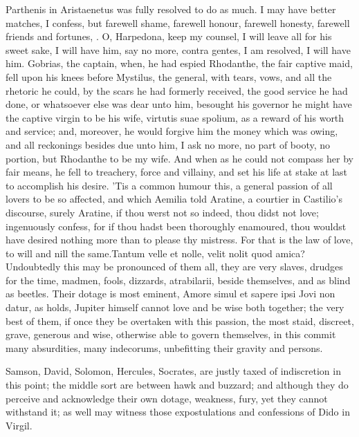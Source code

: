 Parthenis in Aristaenetus was fully resolved to do as much. I may
have better matches, I confess, but farewell shame, farewell honour,
farewell honesty, farewell friends and fortunes, \etc{}. O, Harpedona, keep
my counsel, I will leave all for his sweet sake, I will have him, say
no more, contra gentes, I am resolved, I will have him. Gobrias,
the captain, when, he had espied Rhodanthe, the fair captive maid, fell
upon his knees before Mystilus, the general, with tears, vows, and all
the rhetoric he could, by the scars he had formerly received, the good
service he had done, or whatsoever else was dear unto him, besought his
governor he might have the captive virgin to be his wife, virtutis suae
spolium, as a reward of his worth and service; and, moreover, he would
forgive him the money which was owing, and all reckonings besides due
unto him, I ask no more, no part of booty, no portion, but Rhodanthe to
be my wife. And when as he could not compass her by fair means, he fell
to treachery, force and villainy, and set his life at stake at last to
accomplish his desire. 'Tis a common humour this, a general passion of
all lovers to be so affected, and which Aemilia told Aratine, a
courtier in Castilio's discourse, surely Aratine, if thou werst not so
indeed, thou didst not love; ingenuously confess, for if thou hadst
been thoroughly enamoured, thou wouldst have desired nothing more than
to please thy mistress. For that is the law of love, to will and nill
the same.Tantum velle et nolle, velit nolit quod amica?
Undoubtedly this may be pronounced of them all, they are very slaves,
drudges for the time, madmen, fools, dizzards, atrabilarii,
beside themselves, and as blind as beetles. Their dotage is most
eminent, Amore simul et sapere ipsi Jovi non datur, as \Seneca{} holds,
Jupiter himself cannot love and be wise both together; the very best of
them, if once they be overtaken with this passion, the most staid,
discreet, grave, generous and wise, otherwise able to govern
themselves, in this commit many absurdities, many indecorums,
unbefitting their gravity and persons.

Samson, David, Solomon, Hercules, Socrates, \etc{} are justly taxed of
indiscretion in this point; the middle sort are between hawk and
buzzard; and although they do perceive and acknowledge their own
dotage, weakness, fury, yet they cannot withstand it; as well may
witness those expostulations and confessions of Dido in Virgil.

